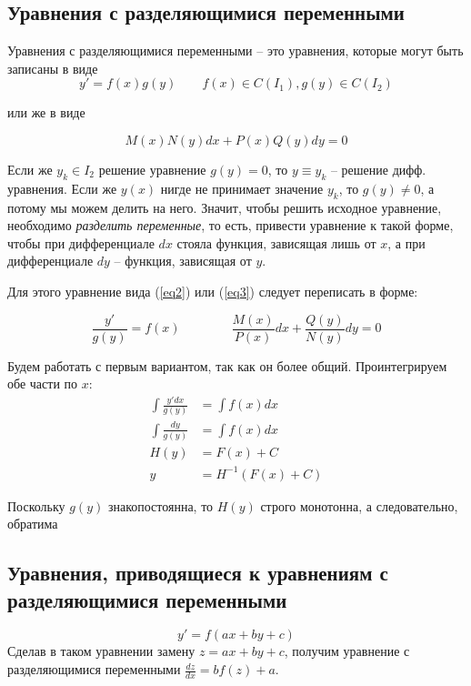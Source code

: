 \subsection*{Уравнения с разделяющимися переменными}

Уравнения с разделяющимися переменными -- это уравнения, которые могут быть записаны в виде
\begin{equation}\label{eq2} 
    y' = f(x)g(y) \qquad f(x) \in C(I_1), g(y) \in C(I_2)
\end{equation}
\begin{center}
    или же в виде
\end{center}
\begin{equation}\label{eq3} 
    M(x)N(y)dx + P(x)Q(y)dy = 0
\end{equation}

\Note Если же $y_k\in I_2$ решение уравнение $g(y) = 0$, то $y\equiv y_k$ -- решение дифф. уравнения.
\bigbreak
Если же $y(x)$ нигде не принимает значение $y_k$, то $g(y) \neq 0$, а потому мы можем делить на него. Значит, чтобы решить исходное уравнение, необходимо \textit{разделить переменные}, то есть, привести уравнение к такой форме, чтобы при дифференциале $dx$ стояла
функция, зависящая лишь от $x$, а при дифференциале $dy$ -- функция, зависящая от $y$. 

Для этого уравнение вида (\ref{eq2}) или (\ref{eq3}) следует переписать в форме:

\begin{equation*}
    \frac{y'}{g(y)} = f(x) \qquad \qquad \frac{M(x)}{P(x)}dx + \frac{Q(y)}{N(y)}dy = 0
\end{equation*}

Будем работать с первым вариантом, так как он более общий. Проинтегрируем обе части по $x$:
\begin{align*}
    \int\frac{y'dx}{g(y)} &= \int f(x)dx \\
    \int\frac{dy}{g(y)} &= \int f(x)dx \\
    H(y) &= F(x) + C \\
    y &= H^{-1}(F(x) + C)
\end{align*}

Поскольку $g(y)$ знакопостоянна, то $H(y)$ строго монотонна, а следовательно, обратима

\subsection*{Уравнения, приводящиеся к уравнениям с разделяющимися переменными}
\begin{equation*}
    y' = f(ax + by + c)
\end{equation*}
Сделав в таком уравнении замену $z = ax + by + c$, получим уравнение с разделяющимися переменными $\frac{dz}{dx} = bf(z) + a$.


